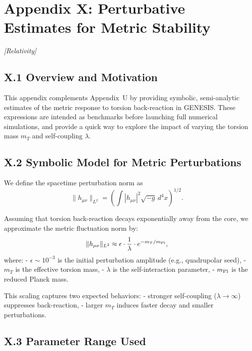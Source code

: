 \documentclass{article}
\newcommand{\grtag}{\textcolor{blue!40!black}{\textit{[Relativity]}}}
\begin{document}
\section*{Appendix X: Perturbative Estimates for Metric Stability}
\label{app:perturb_stability}
\grtag


\subsection*{X.1 Overview and Motivation}

This appendix complements Appendix~U by providing symbolic, semi-analytic estimates of the metric response to torsion back-reaction in GENESIS. These expressions are intended as benchmarks before launching full numerical simulations, and provide a quick way to explore the impact of varying the torsion mass $m_T$ and self-coupling $\lambda$.

\subsection*{X.2 Symbolic Model for Metric Perturbations}

We define the spacetime perturbation norm as
\begin{equation}
\|h_{\mu\nu}\|_{L^2} = \left( \int |h_{\mu\nu}|^2 \sqrt{-g} \, d^4x \right)^{1/2}.
\end{equation}

Assuming that torsion back-reaction decays exponentially away from the core, we approximate the metric fluctuation norm by:
\begin{equation}
\|h_{\mu\nu}\|_{L^2} \approx \epsilon \cdot \frac{1}{\lambda} \cdot e^{-m_T / m_{\rm Pl}},
\label{eq:metric-perturbation-scaling}
\end{equation}
where:
- $\epsilon \sim 10^{-3}$ is the initial perturbation amplitude (e.g., quadrupolar seed),
- $m_T$ is the effective torsion mass,
- $\lambda$ is the self-interaction parameter,
- $m_{\rm Pl}$ is the reduced Planck mass.

This scaling captures two expected behaviors:
- stronger self-coupling ($\lambda \to \infty$) suppresses back-reaction,
- larger $m_T$ induces faster decay and smaller perturbations.

\subsection*{X.3 Parameter Range Used}
\end{document}

